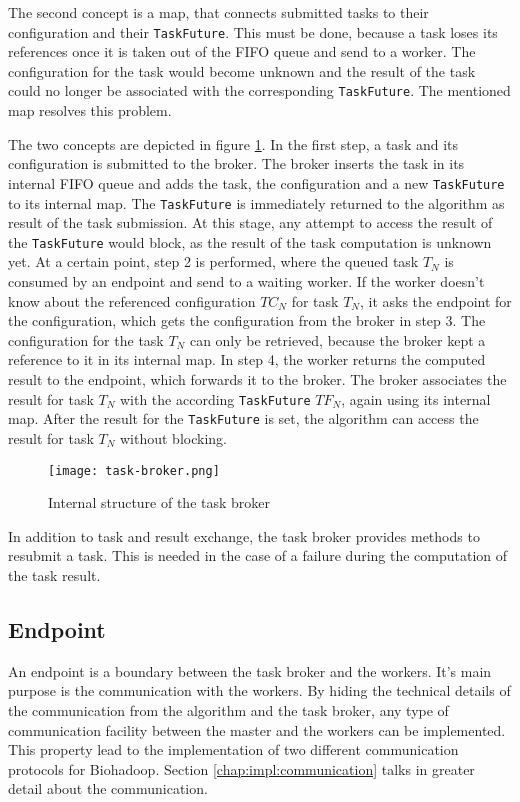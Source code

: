The second concept is a map, that connects submitted tasks to their configuration and their \texttt{TaskFuture}. This must be done, because a task loses its references once it is taken out of the FIFO queue and send to a worker. The configuration for the task would become unknown and the result of the task could no longer be associated with the corresponding \texttt{TaskFuture}. The mentioned map resolves this problem.

The two concepts are depicted in figure \ref{fig:task-broker}. In the first step, a task and its configuration is submitted to the broker. The broker inserts the task in its internal FIFO queue and adds the task, the configuration and a new \texttt{TaskFuture} to its internal map. The \texttt{TaskFuture} is immediately returned to the algorithm as result of the task submission. At this stage, any attempt to access the result of the \texttt{TaskFuture} would block, as the result of the task computation is unknown yet. At a certain point, step 2 is performed, where the queued task $T_N$ is consumed by an endpoint and send to a waiting worker. If the worker doesn't know about the referenced configuration $TC_N$ for task $T_N$, it asks the endpoint for the configuration, which gets the configuration from the broker in step 3. The configuration for the task $T_N$ can only be retrieved, because the broker kept a reference to it in its internal map. In step 4, the worker returns the computed result to the endpoint, which forwards it to the broker. The broker associates the result for task $T_N$ with the according \texttt{TaskFuture} $TF_N$, again using its internal map. After the result for the \texttt{TaskFuture} is set, the algorithm can access the result for task $T_N$ without blocking.

\begin{figure}[ht!]
  \centering
  \texttt{[image: task-broker.png]}
  \caption{Internal structure of the task broker}
  \label{fig:task-broker}
\end{figure}

In addition to task and result exchange, the task broker provides methods to resubmit a task. This is needed in the case of a failure during the computation of the task result.

\subsection{Endpoint}
\label{chap:impl:endpoint}
An endpoint is a boundary between the task broker and the workers. It's main purpose is the communication with the workers. By hiding the technical details of the communication from the algorithm and the task broker, any type of communication facility between the master and the workers can be implemented. This property lead to the implementation of two different communication protocols for Biohadoop. Section \ref{chap:impl:communication} talks in greater detail about the communication.

